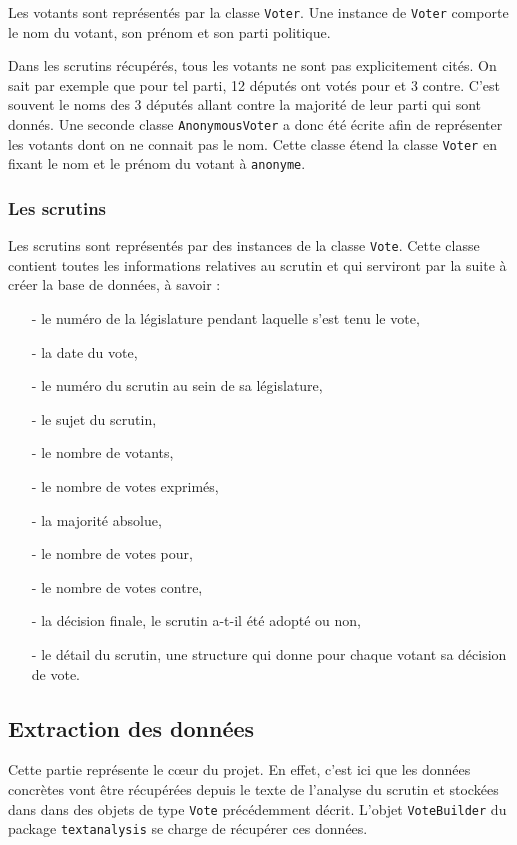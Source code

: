 Les votants sont représentés par la classe \verb|Voter|. Une instance de \verb|Voter| comporte le nom du votant, son prénom et son parti politique.

Dans les scrutins récupérés, tous les votants ne sont pas explicitement cités. On sait par exemple que pour tel parti, 12 députés ont votés pour et 3 contre. C'est souvent le noms des 3 députés allant contre la majorité de leur parti qui sont donnés. Une seconde classe \verb|AnonymousVoter| a donc été écrite afin de représenter les votants dont on ne connait pas le nom. Cette classe étend la classe \verb|Voter| en fixant le nom et le prénom du votant à \verb|anonyme|.

\subsubsection*{Les scrutins}

Les scrutins sont représentés par des instances de la classe \verb|Vote|. Cette classe contient toutes les informations relatives au scrutin et qui serviront par la suite à créer la base de données, à savoir :
\begin{itemize}
\item[-] le numéro de la législature pendant laquelle s'est tenu le vote,
\item[-] la date du vote,
\item[-] le numéro du scrutin au sein de sa législature,
\item[-] le sujet du scrutin,
\item[-] le nombre de votants,
\item[-] le nombre de votes exprimés,
\item[-] la majorité absolue,
\item[-] le nombre de votes pour,
\item[-] le nombre de votes contre,
\item[-] la décision finale, le scrutin a-t-il été adopté ou non,
\item[-] le détail du scrutin, une structure qui donne pour chaque votant sa décision de vote.
\end{itemize}

\subsection{Extraction des données}

Cette partie représente le c\oe{}ur du projet. En effet, c'est ici que les données concrètes vont être récupérées depuis le texte de l'analyse du scrutin et stockées dans dans des objets de type \verb|Vote| précédemment décrit. L'objet \verb|VoteBuilder| du package \verb|textanalysis| se charge de récupérer ces données.

